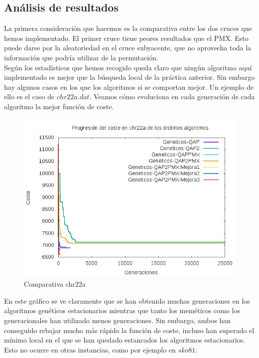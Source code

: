 \subsection{Análisis de resultados}

La primera consideración que hacemos es la comparativa entre los dos cruces que hemos implementado. El primer cruce tiene peores resultados que el PMX. Esto puede darse por la aleatoriedad en el cruce subyacente, que no aprovecha toda la información que podría utilizar de la permutación.\\

Según los estadísticos que hemos recogido queda claro que ningún algoritmo aquí implementado es mejor que la búsqueda local de la práctica anterior. Sin embargo hay algunos casos en los que los algoritmos si se comportan mejor. Un ejemplo de ello es el caso de $chr22a.dat$. Veamos cómo evoluciona en cada generación de cada algoritmo la mejor función de coste.

\begin{figure}[H]
	\centering
	\includegraphics[width=0.7\linewidth]{graficos/comparativachr22a}
	\caption[Comparativa chr22a]{Comparativa chr22a}
	\label{fig:comparativachr22a}
\end{figure}

En este gráfico se ve claramente que se han obtenido muchas generaciones en los algoritmos genéticos estacionarios mientras que tanto los meméticos como los generacionales han utilizado menos generaciones. Sin embargo, ambos han conseguido rebajar mucho más rápido la función de coste, incluso han superado el mínimo local en el que se han quedado estancados los algoritmos estacionarios.\\

Esto no ocurre en otras instancias, como por ejemplo en $sko81$:\\

